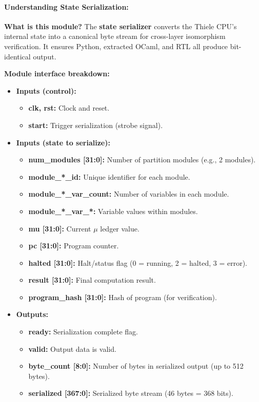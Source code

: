 \paragraph{Understanding State Serialization:}

\textbf{What is this module?} The \textbf{state serializer} converts the Thiele CPU's internal state into a canonical byte stream for cross-layer isomorphism verification. It ensures Python, extracted OCaml, and RTL all produce bit-identical output.

\textbf{Module interface breakdown:}
\begin{itemize}
    \item \textbf{Inputs (control):}
    \begin{itemize}
        \item \textbf{clk, rst:} Clock and reset.
        \item \textbf{start:} Trigger serialization (strobe signal).
    \end{itemize}
    
    \item \textbf{Inputs (state to serialize):}
    \begin{itemize}
        \item \textbf{num\_modules [31:0]:} Number of partition modules (e.g., 2 modules).
        \item \textbf{module\_*\_id:} Unique identifier for each module.
        \item \textbf{module\_*\_var\_count:} Number of variables in each module.
        \item \textbf{module\_*\_var\_*:} Variable values within modules.
        \item \textbf{mu [31:0]:} Current $\mu$ ledger value.
        \item \textbf{pc [31:0]:} Program counter.
        \item \textbf{halted [31:0]:} Halt/status flag (0 = running, 2 = halted, 3 = error).
        \item \textbf{result [31:0]:} Final computation result.
        \item \textbf{program\_hash [31:0]:} Hash of program (for verification).
    \end{itemize}
    
    \item \textbf{Outputs:}
    \begin{itemize}
        \item \textbf{ready:} Serialization complete flag.
        \item \textbf{valid:} Output data is valid.
        \item \textbf{byte\_count [8:0]:} Number of bytes in serialized output (up to 512 bytes).
        \item \textbf{serialized [367:0]:} Serialized byte stream (46 bytes = 368 bits).
    \end{itemize}
\end{itemize}

